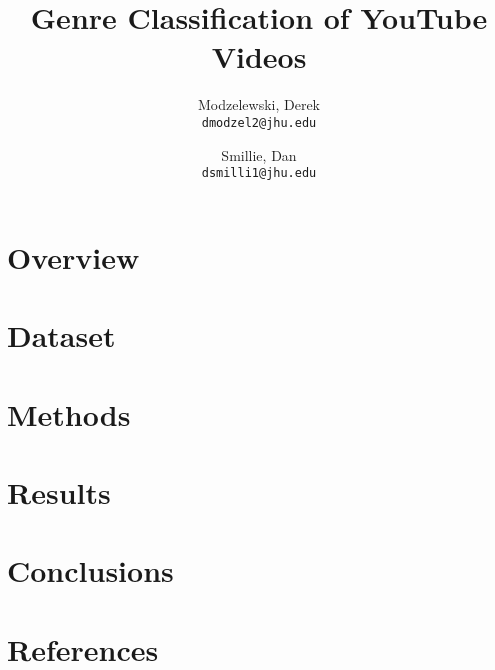 \documentclass{article}
\title{Genre Classification of YouTube Videos}
\author{
  Modzelewski, Derek\\
  \texttt{dmodzel2@jhu.edu}
  \and
  Smillie, Dan\\
  \texttt{dsmilli1@jhu.edu}
}
\begin{document}
\maketitle

\tableofcontents

\section{Overview}

\section{Dataset}

\section{Methods}

\section{Results}

\section{Conclusions}

\section{References}







%
\end{document}
